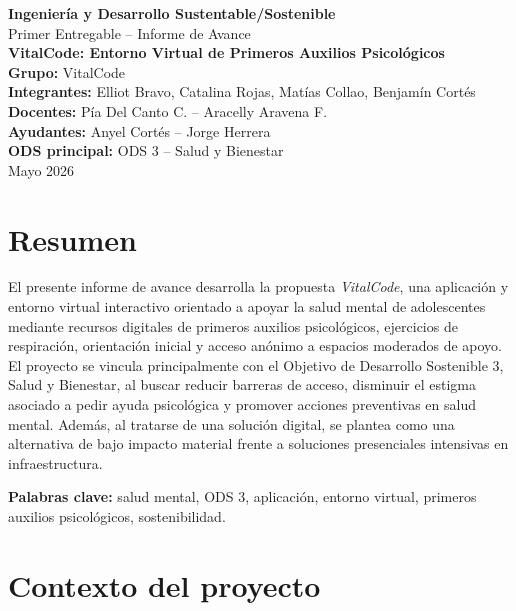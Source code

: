 \documentclass[12pt,letterpaper]{article}
\newcommand{\nombreProyecto}{VitalCode: Entorno Virtual de Primeros Auxilios Psicológicos}
\newcommand{\nombreCurso}{Ingeniería y Desarrollo Sustentable/Sostenible}
\newcommand{\docentes}{Pía Del Canto C. -- Aracelly Aravena F.}
\newcommand{\ayudantes}{Anyel Cortés -- Jorge Herrera}
\newcommand{\grupo}{VitalCode}
\newcommand{\integrantes}{Elliot Bravo, Catalina Rojas, Matías Collao, Benjamín Cortés}
\newcommand{\fecha}{Mayo 2026}
\begin{document}
\begin{titlepage}
    \centering
    \vspace*{1cm}
    {\Large \textbf{\nombreCurso}}\\[0.4cm]
    {\large Primer Entregable -- Informe de Avance}\\[1.5cm]
    {\Huge \textbf{\nombreProyecto}}\\[1cm]
    {\Large \textbf{Grupo:} \grupo}\\[0.4cm]
    {\large \textbf{Integrantes:} \integrantes}\\[0.4cm]
    {\large \textbf{Docentes:} \docentes}\\[0.2cm]
    {\large \textbf{Ayudantes:} \ayudantes}\\[1cm]
    {\large \textbf{ODS principal:} ODS 3 -- Salud y Bienestar}\\[2cm]
    {\large \fecha}
    \vfill
\end{titlepage}

\tableofcontents
\newpage

\section*{Resumen}
El presente informe de avance desarrolla la propuesta \textit{VitalCode}, una aplicación y entorno virtual interactivo orientado a apoyar la salud mental de adolescentes mediante recursos digitales de primeros auxilios psicológicos, ejercicios de respiración, orientación inicial y acceso anónimo a espacios moderados de apoyo. El proyecto se vincula principalmente con el Objetivo de Desarrollo Sostenible 3, Salud y Bienestar, al buscar reducir barreras de acceso, disminuir el estigma asociado a pedir ayuda psicológica y promover acciones preventivas en salud mental. Además, al tratarse de una solución digital, se plantea como una alternativa de bajo impacto material frente a soluciones presenciales intensivas en infraestructura.

\textbf{Palabras clave:} salud mental, ODS 3, aplicación, entorno virtual, primeros auxilios psicológicos, sostenibilidad.

\newpage

\section{Contexto del proyecto}
\end{document}
